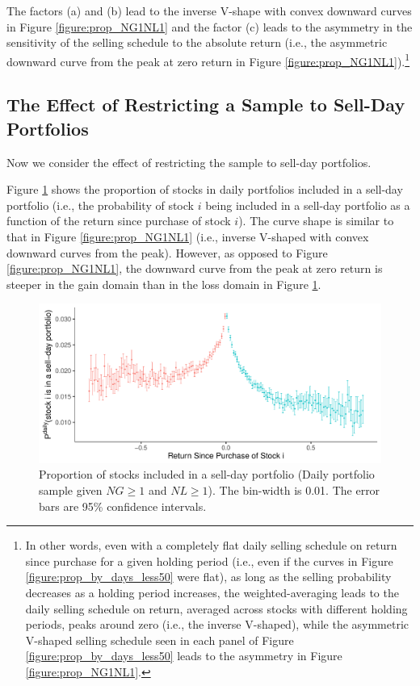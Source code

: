 \documentclass[11pt, a4paper]{article}
\begin{document}
The factors (a) and (b) lead to the inverse V-shape with convex downward curves in Figure \ref{figure:prop_NG1NL1} and the factor (c) leads to the asymmetry in the sensitivity of the selling schedule to the absolute return (i.e., the asymmetric downward curve from the peak at zero return in Figure \ref{figure:prop_NG1NL1}).\footnote{In other words, even with a completely flat daily selling schedule on return since purchase for a given holding period (i.e., even if the curves in Figure \ref{figure:prop_by_days_less50} were flat), as long as the selling probability decreases as a holding period increases, the weighted-averaging leads to the daily selling schedule on return, averaged across stocks with different holding periods, peaks around zero (i.e., the inverse V-shaped), while the asymmetric V-shaped selling schedule seen in each panel of Figure \ref{figure:prop_by_days_less50} leads to the asymmetry in Figure \ref{figure:prop_NG1NL1}.} 


\subsection{The Effect of Restricting a Sample to Sell-Day Portfolios}
\label{section:cond}

Now we consider the effect of restricting the sample to sell-day portfolios. 

Figure \ref{figure:prop_sell_day_NG1NL1} shows the proportion of stocks in daily portfolios included in a sell-day portfolio (i.e., the probability of stock $i$ being included in a sell-day portfolio as a function of the return since purchase of stock $i$). The curve shape is similar to that in Figure \ref{figure:prop_NG1NL1} (i.e., inverse V-shaped with convex downward curves from the peak). However, as opposed to Figure \ref{figure:prop_NG1NL1}, the downward curve from the peak at zero return is steeper in the gain domain than in the loss domain in Figure \ref{figure:prop_sell_day_NG1NL1}. 


\begin{figure}[H]
	\centering
	\includegraphics[width=0.8\columnwidth]{barc_port_sell_NG1_NL1_3.pdf}
	\caption{\small Proportion of stocks included in a sell-day portfolio (Daily portfolio sample given $NG\geq1$ and $NL\geq1$). The bin-width is 0.01. The error bars are 95\% confidence intervals.}
	\label{figure:prop_sell_day_NG1NL1}
\end{figure}
\end{document}
